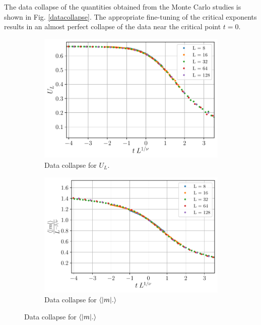 \documentclass[../journal_main.tex]{subfiles}
\begin{document}
The data collapse of the quantities obtained from the Monte Carlo studies is shown in Fig. \ref{datacollapse}. The appropriate fine-tuning of the critical exponents results in an almost perfect collapse of the data near the critical point $t = 0$.
\begin{figure}[!htb]
    \centering
    \begin{subfigure}[b]{0.49\textwidth}  %
        \centering
        \includegraphics[width=\textwidth]{images/data collapse/U_L data collapse.pdf}
        \caption{Data collapse for $U_L$.}
        \label{U_L collapse}
    \end{subfigure}
    \begin{subfigure}[b]{0.49\textwidth}
        \centering
        \includegraphics[width=\textwidth]{images/data collapse/abs(mag) data collapse.pdf}
        \caption{Data collapse for $\expval{\abs{m}.}$}
    \end{subfigure}
\end{figure}
\end{document}
